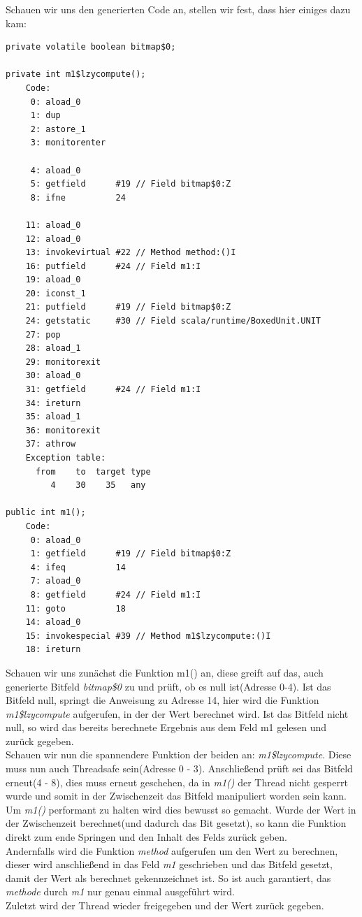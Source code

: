 \documentclass[a4paper, 11pt]{article}
\begin{document}
	  Schauen wir uns den generierten Code an, stellen wir fest, dass hier einiges dazu kam:
	  \begin{lstlisting}
private volatile boolean bitmap$0;

private int m1$lzycompute();
	Code:
	 0: aload_0
	 1: dup
	 2: astore_1
	 3: monitorenter
	 
	 4: aload_0
	 5: getfield      #19 // Field bitmap$0:Z
	 8: ifne          24
	 
	11: aload_0
	12: aload_0
	13: invokevirtual #22 // Method method:()I
	16: putfield      #24 // Field m1:I
	19: aload_0
	20: iconst_1
	21: putfield      #19 // Field bitmap$0:Z
	24: getstatic     #30 // Field scala/runtime/BoxedUnit.UNIT
	27: pop
	28: aload_1
	29: monitorexit
	30: aload_0
	31: getfield      #24 // Field m1:I
	34: ireturn
	35: aload_1
	36: monitorexit
	37: athrow
	Exception table:
	  from    to  target type
	     4    30    35   any

public int m1();
	Code:
	 0: aload_0
	 1: getfield      #19 // Field bitmap$0:Z
	 4: ifeq          14
	 7: aload_0
	 8: getfield      #24 // Field m1:I
	11: goto          18
	14: aload_0
	15: invokespecial #39 // Method m1$lzycompute:()I
	18: ireturn
	  \end{lstlisting}
	  
	Schauen wir uns zunächst die Funktion m1() an, diese greift auf das, auch generierte Bitfeld \textit{bitmap\$0} zu und prüft, ob es null ist(Adresse 0-4). Ist das Bitfeld null, springt die Anweisung zu Adresse 14, hier wird die Funktion \textit{m1\$lzycompute} aufgerufen, in der der Wert berechnet wird. Ist das Bitfeld nicht null, so wird das bereits berechnete Ergebnis aus dem Feld m1 gelesen und zurück gegeben.\\
	Schauen wir nun die spannendere Funktion der beiden an: \textit{m1\$lzycompute}. Diese muss nun auch Threadsafe sein(Adresse 0 - 3). Anschließend prüft sei das Bitfeld erneut(4 - 8), dies muss erneut geschehen, da in \textit{m1()} der Thread nicht gesperrt wurde und somit in der Zwischenzeit das Bitfeld manipuliert worden sein kann. Um \textit{m1()} performant zu halten wird dies bewusst so gemacht. Wurde der Wert in der Zwischenzeit berechnet(und dadurch das Bit gesetzt), so kann die Funktion direkt zum ende Springen und den Inhalt des Felds zurück geben.\\
	Andernfalls wird die Funktion \textit{method} aufgerufen um den Wert zu berechnen, dieser wird anschließend in das Feld \textit{m1} geschrieben und das Bitfeld gesetzt, damit der Wert als berechnet gekennzeichnet ist. So ist auch garantiert, das \textit{methode} durch \textit{m1} nur genau einmal ausgeführt wird.\\
	Zuletzt wird der Thread wieder freigegeben und der Wert zurück gegeben.\\ 
	
\end{document}
